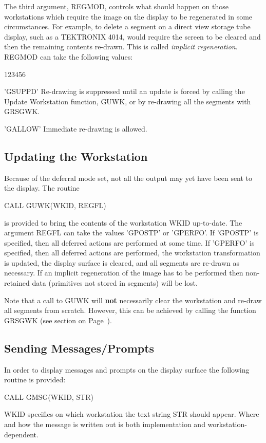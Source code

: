 The third argument, REGMOD, controls what should happen on
those workstations which require the image on the display to be
regenerated in some circumstances.
For example, to delete a segment on a direct view storage tube display,
such as a TEKTRONIX 4014, would require the screen
to be cleared and then the remaining contents re-drawn.
This is called {\it implicit regeneration}.
REGMOD can take the following values:
\begin{DLtt}{123456}
\item['GSUPPD']
Re-drawing is suppressed until an update is forced by calling
the Update Workstation function, GUWK, or by re-drawing all the
segments with GRSGWK.
\item['GALLOW']
Immediate re-drawing is allowed.
\end{DLtt}
\subsection{Updating the Workstation}
 
Because of the deferral mode set, not all the output may yet have been sent
to the display. The routine
\begin{XMP}
CALL GUWK(WKID, REGFL)
\end{XMP}
is provided to bring the contents of the workstation WKID up-to-date.
The argument REGFL can take the values 'GPOSTP' or 'GPERFO'.
If 'GPOSTP' is specified, then all deferred actions are performed
at some time.
If 'GPERFO' is specified, then all deferred actions are performed,
the workstation transformation is updated,
the display surface is cleared, and all segments are
re-drawn as necessary. If an implicit regeneration of the image
has to be performed then non-retained data (primitives not stored
in segments) will be lost.
 
Note that a call to GUWK will {\bf not} necessarily clear
the workstation and re-draw all segments from scratch.
However, this can be achieved by calling the function GRSGWK
(see section on Page~\pageref{sec:grsgwk}).
\subsection{Sending Messages/Prompts}
 
In order to display messages and prompts on the display surface
the following routine is provided:
\begin{XMP}
CALL GMSG(WKID, STR)
\end{XMP}
WKID specifies on which workstation the text string STR should appear.
Where and how the message is written out is both implementation
and workstation-dependent.
